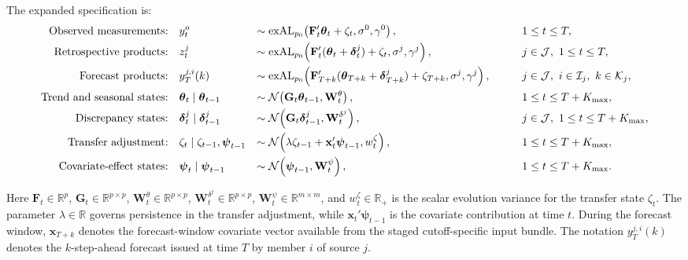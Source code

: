 \documentclass[APA,STIX1COL]{WileyNJD-v2}
\begin{document}
The expanded specification is:
\begin{alignat}{3}
\text{Observed measurements:}\quad&
y_t^o
&\sim{}& \text{exAL}_{p_0}\!\left(\mathbf{F}_t' \boldsymbol{\theta}_t + \zeta_t, \sigma^0, \gamma^0\right),
&\qquad& 1 \le t \le T, \label{eq:unified_usgs}
\\
\text{Retrospective products:}\quad&
z_t^j
&\sim{}& \text{exAL}_{p_0}\!\left(\mathbf{F}_t'(\boldsymbol{\theta}_t + \boldsymbol{\delta}_t^j) + \zeta_t, \sigma^j, \gamma^j\right),
&\qquad& j \in \mathcal{J},\ 1 \le t \le T, \label{eq:unified_retro}
\\
\text{Forecast products:}\quad&
y_T^{j,i}(k)
&\sim{}& \text{exAL}_{p_0}\!\left(\mathbf{F}_{T+k}'(\boldsymbol{\theta}_{T+k} + \boldsymbol{\delta}_{T+k}^j) + \zeta_{T+k}, \sigma^j, \gamma^j\right),
&\qquad& j \in \mathcal{J},\ i \in \mathcal{I}_j,\ k \in \mathcal{K}_j, \notag
\\
\text{Trend and seasonal states:}\quad&
\boldsymbol{\theta}_t \mid \boldsymbol{\theta}_{t-1}
&\sim{}& \mathcal{N}\!\left(\mathbf{G}_t \boldsymbol{\theta}_{t-1}, \mathbf{W}_t^\theta\right),
&\qquad& 1 \le t \le T+K_{\max}, \label{eq:unified_theta}
\\
\text{Discrepancy states:}\quad&
\boldsymbol{\delta}_t^j \mid \boldsymbol{\delta}_{t-1}^j
&\sim{}& \mathcal{N}\!\left(\mathbf{G}_t \boldsymbol{\delta}_{t-1}^j, \mathbf{W}_t^{\delta^j}\right),
&\qquad& j \in \mathcal{J},\ 1 \le t \le T+K_{\max}, \label{eq:unified_delta}
\\
\text{Transfer adjustment:}\quad&
\zeta_t \mid \zeta_{t-1}, \boldsymbol{\psi}_{t-1}
&\sim{}& \mathcal{N}\!\left(\lambda \zeta_{t-1} + \mathbf{x}_t'\boldsymbol{\psi}_{t-1}, w_t^\zeta\right),
&\qquad& 1 \le t \le T+K_{\max}, \label{eq:unified_transfer}
\\
\text{Covariate-effect states:}\quad&
\boldsymbol{\psi}_t \mid \boldsymbol{\psi}_{t-1}
&\sim{}& \mathcal{N}\!\left(\boldsymbol{\psi}_{t-1}, \mathbf{W}_t^\psi\right),
&\qquad& 1 \le t \le T+K_{\max}. \notag
\end{alignat}

Here \(\mathbf{F}_t \in \mathbb{R}^{p}\), \(\mathbf{G}_t \in \mathbb{R}^{p\times p}\), \(\mathbf{W}_t^\theta \in \mathbb{R}^{p\times p}\), \(\mathbf{W}_t^{\delta^j} \in \mathbb{R}^{p\times p}\), \(\mathbf{W}_t^\psi \in \mathbb{R}^{m\times m}\), and \(w_t^\zeta \in \mathbb{R}_+\) is the scalar evolution variance for the transfer state \(\zeta_t\). The parameter \(\lambda \in \mathbb{R}\) governs persistence in the transfer adjustment, while \(\mathbf{x}_t'\boldsymbol{\psi}_{t-1}\) is the covariate contribution at time \(t\). During the forecast window, \(\mathbf{x}_{T+k}\) denotes the forecast-window covariate vector available from the staged cutoff-specific input bundle. The notation \(y_T^{j,i}(k)\) denotes the \(k\)-step-ahead forecast issued at time \(T\) by member \(i\) of source \(j\).
\end{document}
